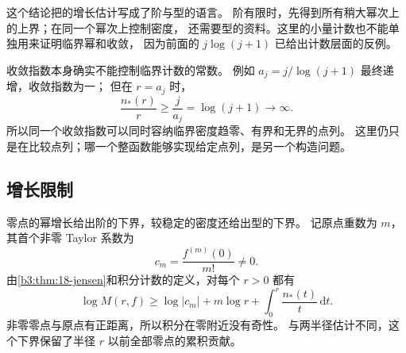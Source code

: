 这个结论把的增长估计写成了阶与型的语言。
阶有限时，先得到所有稍大幂次上的上界；在同一个幂次上控制密度，
还需要型的资料。这里的小量计数也不能单独用来证明临界幂和收敛，
因为前面的 \(j\log(j+1)\) 已给出计数层面的反例。

\ProseParagraphBreak
收敛指数本身确实不能控制临界计数的常数。
例如 \(a_j=j/\log(j+1)\) 最终递增，收敛指数为一；
但在 \(r=a_j\) 时，
\[
 \frac{n_*(r)}r\ge\frac{j}{a_j}=\log(j+1)\longrightarrow\infty.
\]
所以同一个收敛指数可以同时容纳临界密度趋零、有界和无界的点列。
这里仍只是在比较点列；哪一个整函数能够实现给定点列，是另一个构造问题。

\subsection{增长限制}
\label{b3:subsec:190303}

零点的幂增长给出阶的下界，较稳定的密度还给出型的下界。
记原点重数为 \(m\)，其首个非零 Taylor 系数为
\[
 c_m=\frac{f^{(m)}(0)}{m!}\ne0.
\]
由\cref{b3:thm:18-jensen}和积分计数的定义，对每个 \(r>0\) 都有
\begin{equation}\label{b3:eq:19-growth-from-counting}
 \log M(r,f)\ge
 \log|c_m|+m\log r+\int_0^r\frac{n_*(t)}t\,\mathrm dt.
\end{equation}
非零零点与原点有正距离，所以积分在零附近没有奇性。
与两半径估计不同，这个下界保留了半径 \(r\) 以前全部零点的累积贡献。

